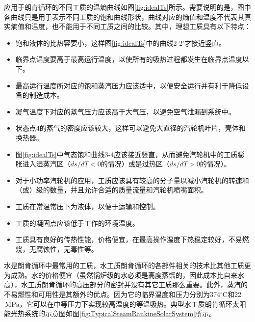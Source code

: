 应用于朗肯循环的不同工质的温熵曲线如图\ref{fig:idealTs}所示。需要说明的是，图中各曲线只是用于表示不同工质的饱和曲线形状，曲线对应的熵值和温度不代表其真实熵值和温度，也不能用于不同工质之间的比较。其中，理想工质具有以下特点\cite{Abbin1977}：
\begin{itemize}

	\item 饱和液体的比热容要小，这样图\ref{fig:idealTs}中的曲线2-2'才接近竖直。
	\item 临界点温度要高于最高运行温度，以使所有的吸热过程都发生在临界点温度以下。
	\item 最高运行温度所对应的饱和蒸汽压力应该适中，以便安全运行并有利于降低设备的制造成本。
	\item 凝气温度下对应的蒸气压力应该高于大气压，以避免空气泄漏到系统中。
	\item 状态点4的蒸气的密度应该较大，这样可以避免大直径的汽轮机叶片，壳体和换热器。
	\item 图\ref{fig:idealTs}中气态饱和曲线3-4应该接近竖直，从而避免汽轮机中的工质膨胀进入湿蒸汽区（$ds/dT < 0$的情况）或是过热区（$ds/dT > 0$的情况）。
	\item 对于小功率汽轮机的应用，工质应该具有较高的分子量以减小汽轮机的转速和（或）级的数量，并且允许合适的质量流量和汽轮机喷嘴面积。
	\item 工质在常温常压下为液体，以便于运输和控制。
	\item 工质的凝固点应该低于工作的环境温度。
	\item 工质具有良好的传热性能，价格便宜，在最高操作温度下热稳定较好，不易燃烧，无腐蚀性，无毒性等。
\end{itemize}

水是朗肯循环中最常用的工质，水工质朗肯循环的各部件相关的技术比其他工质更为成熟。水的价格便宜（虽然锅炉级的水必须是高度蒸馏的，因此成本比自来水高），水工质朗肯循环的高压部分的密封并没有其它工质那么重要。此外，蒸汽的不易燃性和可用性是其额外的优点。因为它的临界温度和压力分别为374$\mathrm{^\circ C}$和22$\,\mathrm{MPa}$，它可以在中等压力下实现较高温度的等温吸热。典型水工质朗肯循环太阳能光热系统的示意图如图\ref{fig:TypicalSteamRankineSolarSystem}所示。

